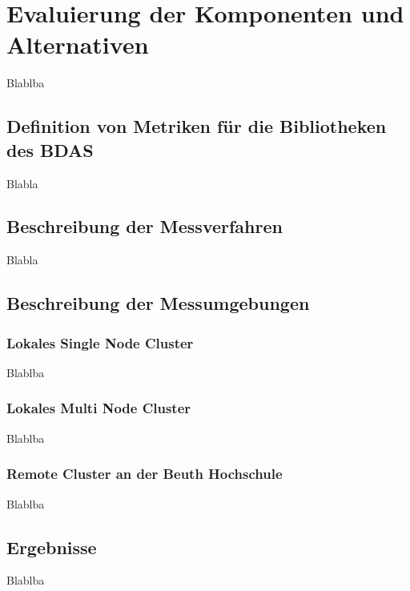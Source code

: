 \chapter{Evaluierung der Komponenten und Alternativen }
\label{chapter:evaluierung}



Blablba

\section{Definition von Metriken für die Bibliotheken des BDAS}
\label{section:definition der metriken}

Blabla



\section{Beschreibung der Messverfahren}
\label{section:messumgebungen}

Blabla


\section{Beschreibung der Messumgebungen}
\label{section:messumgebungen}

\subsection{Lokales Single Node Cluster  }
\label{section:lokales single node}

Blablba

\subsection{Lokales Multi Node Cluster}
\label{section:tachyon}

Blablba

\subsection{Remote Cluster an der Beuth Hochschule}
\label{section:remote}

Blablba

\section{Ergebnisse}
\label{section:ergebnisse}

Blablba

